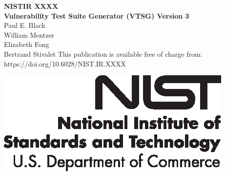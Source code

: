 \documentclass[12pt]{article}
\newcommand{\pubnumber}{XXXX}
\newcommand{\DOI}{https://doi.org/10.6028/NIST.IR.XXXX}
\newcommand{\paperTitle}{Vulnerability Test Suite Generator (VTSG) Version 3}
\begin{document}

\begin{titlepage}
\begin{flushright}
\LARGE{\textbf{NISTIR \pubnumber}}\\
\vfill
\Huge{\textbf{\paperTitle}}\\
    \vfill
    \large Paul E. Black \\
    \large William Mentzer\\
    \large Elizabeth Fong \\
    \large Bertrand Stivalet
\vfill
\normalsize This publication is available free of charge from:\\
\DOI\\
\vfill

\includegraphics[width=0.3\linewidth]{NIST-logo.eps}\\ 
 
  
\end{flushright}
\end{titlepage}
\end{document}
